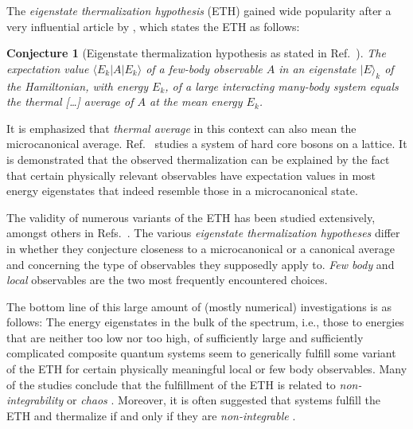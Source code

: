 \documentclass[a4paper,12pt,listof=totoc,index=totoc,bibliography=totoc,headsepline=false,headings=normal,BCOR16.153846mm,DIV12,headinclude,twoside,cleardoublepage=empty,numbers=noenddot,final]{scrreprt}
\theoremstyle{mystyle}
\numberwithin{equation}{section}
\numberwithin{figure}{section}
\numberwithin{lemma}{section}
\numberwithin{theorem}{section}
\numberwithin{corollary}{section}
\numberwithin{definition}{section}
\newtheorem{conjecture}{Conjecture}
\numberwithin{conjecture}{section}
\numberwithin{observation}{section}
\newcommand{\+}{\mkern2mu}
\newcommand{\bra}[1]{\langle #1|}
\newcommand{\ket}[1]{|#1\rangle}
\DeclareMathOperator{\1}{\mathds{1}}
\begin{document}
The \emph{eigenstate thermalization hypothesis} (ETH) gained wide popularity after a very influential article by \textcite{Rigol08}, which states the ETH as follows:
\begin{conjecture}[Eigenstate thermalization hypothesis as stated in Ref.~\cite{Rigol08}] \label{conjecture:ethrigolform}
  The expectation value $\bra{E_k} A \ket{E_k}$ of a few-body observable $A$ in an eigenstate $\ket E_k$ of the Hamiltonian, with energy $E_k$, of a large interacting many-body system equals the thermal [\dots] average of $A$ at the mean energy $E_k$.
\end{conjecture}
It is emphasized that \emph{thermal average} in this context can also mean the microcanonical average.
Ref.~\cite{Rigol08} studies a system of hard core bosons on a lattice.
It is demonstrated that the observed thermalization can be explained by the fact that certain physically relevant observables have expectation values in most energy eigenstates that indeed resemble those in a microcanonical state.

The validity of numerous variants of the ETH has been studied extensively, amongst others in Refs.~\cite{Santos10,Sirker2013,1102.0528v1,Biroli09,Singh,Ikeda11,Rigol08,Rigol11,1103.0787v1,Neuenhahn10,1108.0928v1,1111.6119,Mazets10,Polkovnikov11,Cassidy11,1104.3232v1,1004.2232v1,1201.0578v1,PhysRevLett.10-6,Polkovnikov11,Rigol09,1112.3424v1.pd,Cazalilla10,PhysRevB.82.17,Cazalilla11,Gritsev10,Iucci2009,Wilming2011,1108.0928v1,Steinigeweg2013,Beugeling2013,Ikeda2013a}.
The various \emph{eigenstate thermalization hypotheses} differ in whether they conjecture closeness to a microcanonical or a canonical average and concerning the type of observables they supposedly apply to. 
\emph{Few body} and \emph{local} observables are the two most frequently encountered choices. 

The bottom line of this large amount of (mostly numerical) investigations is as follows:
The energy eigenstates in the bulk of the spectrum, i.e., those to energies that are neither too low nor too high, of sufficiently large and sufficiently complicated composite quantum systems seem to generically fulfill some variant of the ETH for certain physically meaningful local or few body observables.
Many of the studies conclude that the fulfillment of the ETH is related to \emph{non-integrability} or \emph{chaos} \cite{1103.0787v1,1102.0528v1,Polkovnikov11,1108.0928v1,Neuenhahn10,Larson13,1201.0186v1,Beugeling2013,1112.3424v1.pd,Beugeling2013,Singh}.
Moreover, it is often suggested that systems fulfill the ETH and thermalize if and only if they are \emph{non-integrable} \cite{Rigol08,Rigol09,Rigol11,Biroli09,Znidaric09}.
\end{document}
